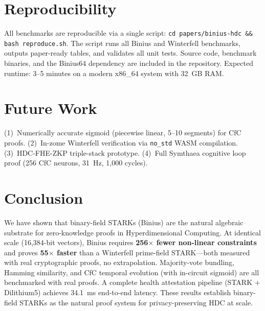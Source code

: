 \documentclass[11pt,twocolumn]{article}
\begin{document}
\section{Reproducibility}

All benchmarks are reproducible via a single script:
\texttt{cd papers/binius-hdc \&\& bash reproduce.sh}. The script runs all Binius and Winterfell benchmarks, outputs paper-ready tables, and validates all unit tests. Source code, benchmark binaries, and the Binius64 dependency are included in the repository. Expected runtime: 3--5 minutes on a modern x86\_64 system with 32~GB RAM.

\section{Future Work}

(1)~Numerically accurate sigmoid (piecewise linear, 5--10 segments) for CfC proofs. (2)~In-zome Winterfell verification via \texttt{no\_std} WASM compilation. (3)~HDC-FHE-ZKP triple-stack prototype. (4)~Full Symthaea cognitive loop proof (256 CfC neurons, 31~Hz, 1,000 cycles).

\section{Conclusion}

We have shown that binary-field STARKs (Binius) are the natural algebraic substrate for zero-knowledge proofs in Hyperdimensional Computing. At identical scale (16,384-bit vectors), Binius requires \textbf{256$\times$ fewer non-linear constraints} and proves \textbf{55$\times$ faster} than a Winterfell prime-field STARK---both measured with real cryptographic proofs, no extrapolation. Majority-vote bundling, Hamming similarity, and CfC temporal evolution (with in-circuit sigmoid) are all benchmarked with real proofs. A complete health attestation pipeline (STARK + Dilithium5) achieves 34.1~ms end-to-end latency. These results establish binary-field STARKs as the natural proof system for privacy-preserving HDC at scale.
\end{document}
